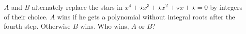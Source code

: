 $A$ and $B$ alternately replace the stars in $x^4 + {\star}x^3 + {\star}x^2 + {\star}x + {\star} = 0$ by integers of their choice. $A$ wins if he gets a polynomial without integral roots after the fourth step. Otherwise $B$ wins. Who wins, $A$ or $B$?
